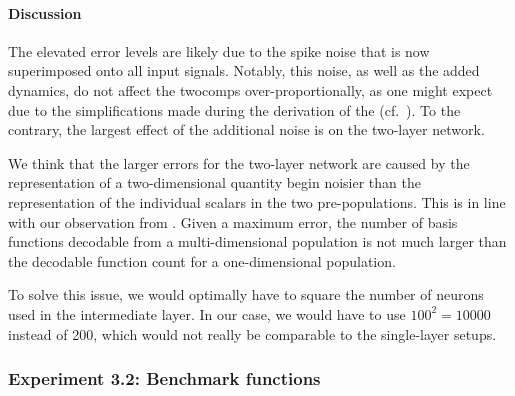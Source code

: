 \paragraph{Discussion}

The elevated error levels are likely due to the spike noise that is now superimposed onto all input signals.
Notably, this noise, as well as the added dynamics, do not affect the \glspl{twocomp} over-proportionally, as one might expect due to the simplifications made during the derivation of the  (cf.~).
To the contrary, the largest effect of the additional noise is on the two-layer network.

We think that the larger errors for the two-layer network are caused by the representation of a two-dimensional quantity begin noisier than the representation of the individual scalars in the two pre-populations.
This is in line with our observation from .
Given a maximum error, the number of basis functions decodable from a multi-dimensional population is not much larger than the decodable function count for a one-dimensional population.

To solve this issue, we would optimally have to square the number of neurons used in the intermediate layer.
In our case, we would have to use $100^2 = \num{10000}$ instead of \num{200}, which would not really be comparable to the single-layer setups.

\subsubsection{Experiment 3.2: Benchmark functions}


